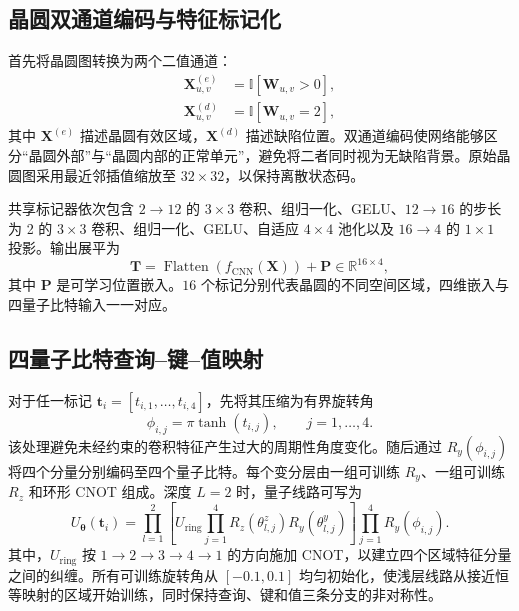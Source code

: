 \documentclass[journal]{IEEEtran}
\newcommand{\R}{\mathbb{R}}
\begin{document}
\subsection{晶圆双通道编码与特征标记化}

首先将晶圆图转换为两个二值通道：
\begin{align}
  \bm{X}^{(e)}_{u,v}&=\mathbb{I}[\bm{W}_{u,v}>0],\\
  \bm{X}^{(d)}_{u,v}&=\mathbb{I}[\bm{W}_{u,v}=2],
\end{align}
其中 $\bm{X}^{(e)}$ 描述晶圆有效区域，$\bm{X}^{(d)}$ 描述缺陷位置。双通道编码使网络能够区分“晶圆外部”与“晶圆内部的正常单元”，避免将二者同时视为无缺陷背景。原始晶圆图采用最近邻插值缩放至 $32\times32$，以保持离散状态码。

共享标记器依次包含 $2\rightarrow12$ 的 $3\times3$ 卷积、组归一化、GELU、$12\rightarrow16$ 的步长为 2 的 $3\times3$ 卷积、组归一化、GELU、自适应 $4\times4$ 池化以及 $16\rightarrow4$ 的 $1\times1$ 投影。输出展平为
\begin{equation}
  \bm{T}=\operatorname{Flatten}(f_{\mathrm{CNN}}(\bm{X}))
  +\bm{P}\in\R^{16\times4},
  \label{eq:tokens}
\end{equation}
其中 $\bm{P}$ 是可学习位置嵌入。$16$ 个标记分别代表晶圆的不同空间区域，四维嵌入与四量子比特输入一一对应。

\subsection{四量子比特查询--键--值映射}

对于任一标记 $\bm{t}_i=[t_{i,1},\ldots,t_{i,4}]$，先将其压缩为有界旋转角
\begin{equation}
  \phi_{i,j}=\pi\tanh(t_{i,j}),\qquad j=1,\ldots,4.
  \label{eq:angle_encoding}
\end{equation}
该处理避免未经约束的卷积特征产生过大的周期性角度变化。随后通过 $R_y(\phi_{i,j})$ 将四个分量分别编码至四个量子比特。每个变分层由一组可训练 $R_y$、一组可训练 $R_z$ 和环形 CNOT 组成。深度 $L=2$ 时，量子线路可写为
\begin{equation}
  U_{\bm{\theta}}(\bm{t}_i)
  =\prod_{l=1}^{2}
  \left[
    U_{\mathrm{ring}}
    \prod_{j=1}^{4}R_z(\theta^{z}_{l,j})R_y(\theta^{y}_{l,j})
  \right]
  \prod_{j=1}^{4}R_y(\phi_{i,j}).
  \label{eq:q_circuit}
\end{equation}
其中，$U_{\mathrm{ring}}$ 按 $1\rightarrow2\rightarrow3\rightarrow4\rightarrow1$ 的方向施加 CNOT，以建立四个区域特征分量之间的纠缠。所有可训练旋转角从 $[-0.1,0.1]$ 均匀初始化，使浅层线路从接近恒等映射的区域开始训练，同时保持查询、键和值三条分支的非对称性。
\end{document}
